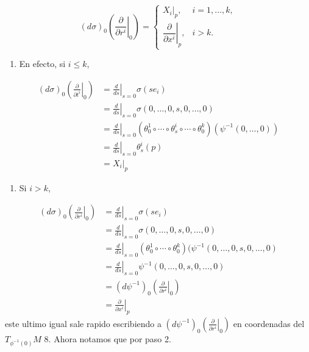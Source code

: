 \begin{bookproof}{}
\[
(d\sigma)_0\left(\left.\frac{\partial}{\partial r^i}\right|_0\right)=\begin{cases} X_i|_p, & i=1,\ldots,k,\\[4pt] \left.\dfrac{\partial}{\partial x^i}\right|_p, & i>k.\end{cases}
\]
\begin{enumerate}[start=6]
\item En efecto, si $i\leq k$,
\end{enumerate}
\[
\begin{aligned}(d\sigma)_0\left(\left.\frac{\partial}{\partial t^i}\right|_0\right)&=\left.\frac{d}{ds}\right|_{s=0}\sigma(se_i)\\&=\left.\frac{d}{ds}\right|_{s=0}\sigma(0,\ldots,0,s,0,\ldots,0)\\&=\left.\frac{d}{ds}\right|_{s=0}\left(\theta^{1}_{0}\circ\cdots\circ\theta^{i}_{s}\circ\cdots\circ\theta^{k}_{0}\right)\left(\psi^{-1}(0,\ldots,0)\right)\\&=\left.\frac{d}{ds}\right|_{s=0}\theta^{i}_{s}(p)\\&=X_i|_p\end{aligned}
\]
\begin{enumerate}[start=7]
\item Si $i>k$,
\end{enumerate}
\[
\begin{aligned}(d\sigma)_0\left(\left.\frac{\partial}{\partial r^i}\right|_0\right)&=\left.\frac{d}{ds}\right|_{s=0}\sigma(se_i)\\&=\left.\frac{d}{ds}\right|_{s=0}\sigma(0,\ldots,0,s,0,\ldots,0)\\&=\left.\frac{d}{ds}\right|_{s=0}(\theta^{1}_{0}\circ\cdots\circ\theta^{k}_{0})(\psi^{-1}(0,\ldots,0,s,0,\ldots,0)\\&=\left.\frac{d}{ds}\right|_{s=0}\psi^{-1}(0,\ldots,0,s,0,\ldots,0)\\&=(d\psi^{-1})_0\left(\left.\frac{\partial}{\partial r^i}\right|_0\right)\\&=\left.\frac{\partial}{\partial x^i}\right|_p\end{aligned}
\]
este ultimo igual sale rapido escribiendo a $(d\psi^{-1})_0\left(\left.\frac{\partial}{\partial r^i}\right|_0\right)$ en coordenadas del $T_{\phi ^{-1}(0)}M$ 8. Ahora notamos que por paso 2.


\end{bookproof}
